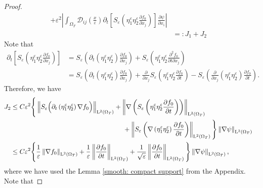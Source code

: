 \documentclass[preprint, 12pt]{amsart}
\numberwithin{equation}{section}
\numberwithin{equation}{section}
\newcommand{\eps}{\varepsilon}
\begin{document}
\begin{proof}
\begin{equation*}
\begin{aligned}
+ \eps^2 \left\vert \int_{\Omega_T} \mathcal{D}_{ij} \left(\frac{x}{\eps}\right) \partial_t\left[S_\eps \left(\eta_1^\eps \eta_2^\eps \frac{\partial f_0}{\partial x_j}\right)\right] \frac{\partial \psi}{\partial x_i} \right\vert
\\
& =: J_1 + J_2
\end{aligned}
\end{equation*}
Note that 
\begin{equation*}
\begin{aligned}
\partial_t\left[S_\eps \left(\eta_1^\eps \eta_2^\eps \frac{\partial f_0}{\partial x_j}\right)\right] 
& = S_\eps \left(\partial_t\left(\eta_1^\eps \eta_2^\eps\right) \frac{\partial f_0}{\partial x_j}\right)
+ S_\eps \left(\eta_1^\eps \eta_2^\eps \frac{\partial^2 f_0}{\partial t\partial x_j}\right)
\\
& = S_\eps \left(\partial_t\left(\eta_1^\eps \eta_2^\eps\right) \frac{\partial f_0}{\partial x_j}\right)
+ \frac{\partial}{\partial x_j} S_\eps \left(\eta_1^\eps \eta_2^\eps \frac{\partial f_0}{\partial t}\right)
- S_\eps \left(\frac{\partial}{\partial x_j}\left(\eta_1^\eps \eta_2^\eps\right) \frac{\partial f_0}{\partial t}\right).
\end{aligned}
\end{equation*}
Therefore, we have
\begin{equation*}
\begin{aligned}
J_2 & \le C \eps^2 \Bigg\{ 
\left\Vert S_\eps \Big(\partial_t\left(\eta_1^\eps \eta_2^\eps\right) \nabla f_0\Big) \right\Vert_{\mathrm L^2(\Omega_T)}
+ \left\Vert \nabla \left( S_\eps \left(\eta_1^\eps \eta_2^\eps \frac{\partial f_0}{\partial t}\right) \right)\right\Vert_{\mathrm L^2(\Omega_T)}
\\
& \hspace{6.0 cm}+ \left\Vert S_\eps \left(\nabla\left(\eta_1^\eps \eta_2^\eps\right) \frac{\partial f_0}{\partial t}\right)\right\Vert_{\mathrm L^2(\Omega_T)}
\Bigg\} \left\Vert \nabla\psi \right\Vert_{\mathrm L^2(\Omega_T)}
\\
& \le C \eps^2 \Bigg\{ \frac{1}{\eps} \left\Vert \nabla f_0 \right\Vert_{\mathrm L^2(\Omega_T)}
+ \frac{1}{\eps} \left\Vert \frac{\partial f_0}{\partial t} \right\Vert_{\mathrm L^2(\Omega_T)}
+ \frac{1}{\sqrt{\eps}} \left\Vert \frac{\partial f_0}{\partial t} \right\Vert_{\mathrm L^2(\Omega_T)}
\Bigg\} \left\Vert \nabla\psi \right\Vert_{\mathrm L^2(\Omega_T)},
\end{aligned}
\end{equation*}
where we have used the Lemma \ref{smooth: compact support} from the Appendix. Note that

\end{proof}
\end{document}
